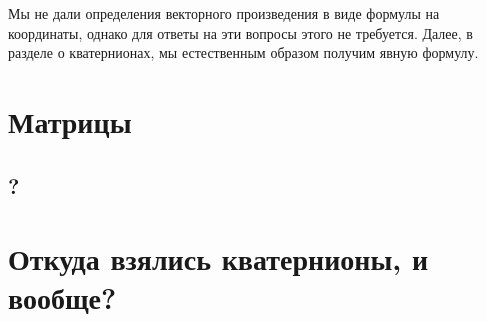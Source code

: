 \documentclass[a4paper,12pt]{article}
\begin{document}
Мы не дали определения векторного произведения в виде формулы на координаты, однако для ответы на эти вопросы этого не требуется. Далее, в разделе о кватернионах, мы естественным образом получим явную формулу.

\section*{Матрицы}
\subsection*{?}

\section*{Откуда взялись кватернионы, и вообще?}



\newpage
\nocite{*}
\printbibliography[nottype=unpublished]
\end{document}
